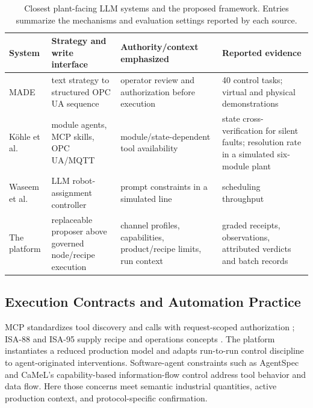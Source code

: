 \begin{table}[!t]
\centering
\caption{Closest plant-facing LLM systems and the proposed framework.
Entries summarize the mechanisms and evaluation settings reported by each source.}
\label{tab:nearest}
\footnotesize
\setlength{\tabcolsep}{3pt}
\begin{tabularx}{\textwidth}{@{}p{2.7cm}XXX@{}}
\toprule
System & Strategy and write interface & Authority/context emphasized &
Reported evidence \\
\midrule
MADE \cite{huang2026made} & text strategy to structured OPC UA sequence &
operator review and authorization before execution & 40 control tasks;
virtual and physical demonstrations \\
K{\"o}hle et al.\ \cite{koehle2026llmdriven} & module agents, MCP skills,
OPC UA/MQTT & module/state-dependent tool availability & state cross-verification
for silent faults; resolution rate in a simulated six-module plant \\
Waseem et al.\ \cite{waseem2026pretrained} & LLM robot-assignment controller &
prompt constraints in a simulated line & scheduling throughput \\
\midrule
The platform & replaceable proposer above governed node/recipe execution &
channel profiles, capabilities, product/recipe limits, run context &
graded receipts, observations, attributed verdicts and batch records \\
\bottomrule
\end{tabularx}
\end{table}

\subsection{Execution Contracts and Automation Practice}
MCP standardizes tool discovery and calls with request-scoped authorization
\cite{mcp2024}; ISA-88 and ISA-95 supply recipe and operations concepts
\cite{isa88_2010,isa95_2025}. The platform instantiates
a reduced production model and adapts run-to-run control discipline
\cite{moyne2000r2r} to agent-originated interventions. Software-agent
constraints such as AgentSpec \cite{wang2025agentspec} and CaMeL's
capability-based information-flow control \cite{debenedetti2025camel}
address tool behavior and data flow. Here those concerns meet semantic
industrial quantities, active production context, and protocol-specific
confirmation.

